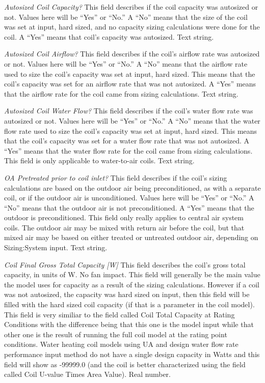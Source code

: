 \emph{Autosized Coil Capacity?} This field describes if the coil capacity was autosized or not.  Values here will be ``Yes'' or ``No.''  A ``No'' means that the size of the coil was set at input, hard sized, and no capacity sizing calculations were done for the coil. A ``Yes'' means that coil's capacity was autosized. Text string.

\emph{Autosized Coil Airflow?} This field describes if the coil's airflow rate was autosized or not. Values here will be ``Yes'' or ``No.''  A ``No'' means that the airflow rate used to size the coil's capacity was set at input, hard sized.  This means that the coil's capacity was set for an airflow rate that was not autosized. A ``Yes'' means that the airflow rate for the coil came from sizing calculations. Text string.

\emph{Autosized Coil Water Flow?} This field describes if the coil's water flow rate was autosized or not. Values here will be ``Yes'' or ``No.''  A ``No'' means that the water flow rate used to size the coil's capacity was set at input, hard sized.  This means that the coil's capacity was set for a water flow rate that was not autosized. A ``Yes'' means that the water flow rate for the coil came from sizing calculations.  This field is only applicable to water-to-air coils. Text string.

\emph{OA Pretreated prior to coil inlet?} This field describes if the coil's sizing calculations are based on the outdoor air being preconditioned, as with a separate coil, or if the outdoor air is unconditioned. Values here will be ``Yes'' or ``No.''  A ``No'' means that the outdoor air is not preconditioned.  A ``Yes'' means that the outdoor is preconditioned.  This field only really applies to central air system coils.  The outdoor air may be mixed with return air before the coil, but that mixed air may be based on either treated or untreated outdoor air, depending on Sizing:System input.  Text string.

\emph{Coil Final Gross Total Capacity [W]} This field describes the coil's gross total capacity, in units of W.  No fan impact.  This field will generally be the main value the model uses for capacity as a result of the sizing calculations.  However if a coil was not autosized, the capacity was hard sized on input, then this field will be filled with the hard sized coil capacity (if that is a parameter in the coil model).  This field is very similiar to the field called Coil Total Capacity at Rating Conditions with the difference being that this one is the model input while that other one is the result of running the full coil model at the rating point conditions.  Water heating coil models using UA and design water flow rate performance input method do not have a single design capacity in Watts and this field will show as -99999.0 (and the coil is better characterized using the field called Coil U-value Times Area Value).  Real number. 

